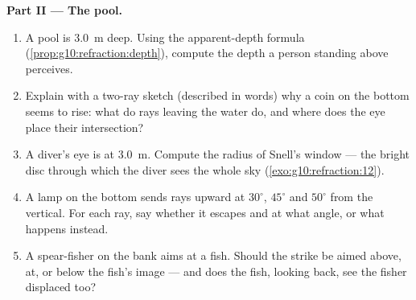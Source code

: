 \begin{problem}
\medskip
\noindent\textbf{Part II --- The pool.}
\begin{enumerate}[resume]
  \item A pool is \qty{3.0}{m} deep. Using the apparent-depth formula
        (\cref{prop:g10:refraction:depth}), compute the depth a person
        standing above perceives.
  \item Explain with a two-ray sketch (described in words) why a coin
        on the bottom seems to rise: what do rays leaving the water do,
        and where does the eye place their intersection?
  \item A diver's eye is at \qty{3.0}{m}. Compute the radius of Snell's
        window --- the bright disc through which the diver sees the
        whole sky (\cref{exo:g10:refraction:12}).
  \item A lamp on the bottom sends rays upward at $30^\circ$,
        $45^\circ$ and $50^\circ$ from the vertical. For each ray, say
        whether it escapes and at what angle, or what happens instead.
  \item A spear-fisher on the bank aims at a fish. Should the strike be
        aimed above, at, or below the fish's image --- and does the
        fish, looking back, see the fisher displaced too?
\end{enumerate}


\end{problem}
